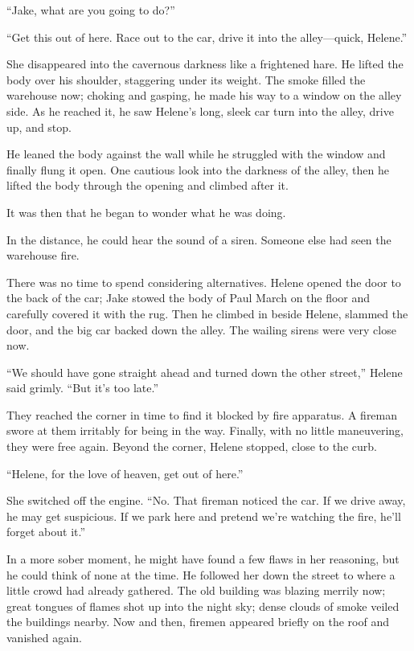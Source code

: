 \documentclass{novel}
\begin{document}
“Jake, what are you going to do?”

“Get this out of here. Race out to the car, drive it into the alley—quick, Helene.”

She disappeared into the cavernous darkness like a frightened hare. He lifted the body over his shoulder, staggering under its weight. The smoke filled the warehouse now; choking and gasping, he made his way to a window on the alley side. As he reached it, he saw Helene’s long, sleek car turn into the alley, drive up, and stop.

He leaned the body against the wall while he struggled with the window and finally flung it open. One cautious look into the darkness of the alley, then he lifted the body through the opening and climbed after it.

It was then that he began to wonder what he was doing.

In the distance, he could hear the sound of a siren. Someone else had seen the warehouse fire.

There was no time to spend considering alternatives. Helene opened the door to the back of the car; Jake stowed the body of Paul March on the floor and carefully covered it with the rug. Then he climbed in beside Helene, slammed the door, and the big car backed down the alley. The wailing sirens were very close now.

“We should have gone straight ahead and turned down the other street,” Helene said grimly. “But it’s too late.”

They reached the corner in time to find it blocked by fire apparatus. A fireman swore at them irritably for being in the way. Finally, with no little maneuvering, they were free again. Beyond the corner, Helene stopped, close to the curb.

“Helene, for the love of heaven, get out of here.”

She switched off the engine. “No. That fireman noticed the car. If we drive away, he may get suspicious. If we park here and pretend we’re watching the fire, he’ll forget about it.”

In a more sober moment, he might have found a few flaws in her reasoning, but he could think of none at the time. He followed her down the street to where a little crowd had already gathered. The old building was blazing merrily now; great tongues of flames shot up into the night sky; dense clouds of smoke veiled the buildings nearby. Now and then, firemen appeared briefly on the roof and vanished again.
\end{document}
